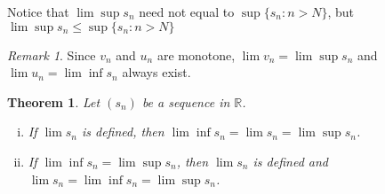 \documentclass[12pt, lettersize]{book}
\theoremstyle{plain}
\newtheorem{thm}{Theorem}[section]
\theoremstyle{definition}
\theoremstyle{remark}
\newtheorem*{rem}{Remark}
\begin{document}
		Notice that $\lim\sup s_n$ need not equal to $\sup\{s_n: n>N\}$, but $\lim\sup s_n\leq\sup\{s_n: n>N\}$
		\begin{rem}
			Since $v_n$ and $u_n$ are monotone, $\lim v_n=\lim\sup s_n$ and $\lim u_n=\lim\inf s_n$ always exist.
		\end{rem}
		
		\begin{thm}\label{def:condition for limit}
		Let $(s_n)$ be a sequence in $\mathbb{R}$.
		\begin{enumerate}[(i)]
			\item If $\lim s_n$ is defined, then $\lim\inf s_n=\lim s_n=\lim\sup s_n$.
			\item If $\lim\inf s_n=\lim\sup s_n$, then $\lim s_n$ is defined and $\lim s_n=\lim\inf s_n=\lim\sup s_n$.
		\end{enumerate}
		\end{thm}
\end{document}
